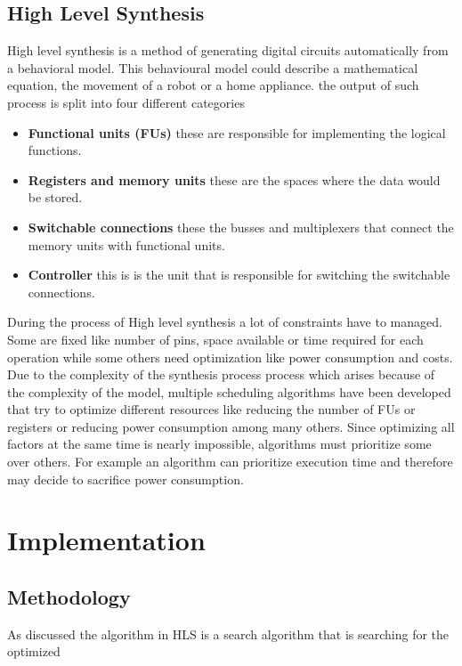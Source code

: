 \documentclass[conference]{IEEEtran}
\begin{document}
\subsection{High Level Synthesis}
High level synthesis is a method of generating digital circuits automatically from a behavioral model. This behavioural model  could describe a mathematical equation, the movement of a robot or a home appliance. the output of such process is split into four different categories \cite{fourcategories}
\begin{itemize}
    \item \textbf{Functional units (FUs)} these are responsible for implementing the logical functions.
    \item \textbf{Registers and memory units} these are the spaces where the data would be stored.
    \item \textbf{Switchable connections} these the busses and multiplexers that connect the memory units with functional units.
    \item \textbf{Controller} this is is the unit that is responsible for switching the switchable connections.
\end{itemize}
During the process of High level synthesis a lot of constraints have to managed. Some are fixed like number of pins, space available or time required for each operation while some others need optimization like power consumption and costs.
Due to the complexity of the synthesis process process which arises because of the complexity of the model, multiple scheduling algorithms have been developed that try to optimize different resources\cite{489146} like reducing the number of FUs or registers or reducing power consumption among many others. Since optimizing all factors at the same time is nearly impossible, algorithms must prioritize some over others. For example an algorithm can prioritize execution time and therefore may decide to sacrifice power consumption.

\section{Implementation}

\subsection{Methodology}
As discussed the algorithm in HLS is a search algorithm that is searching for the optimized 
\end{document}
